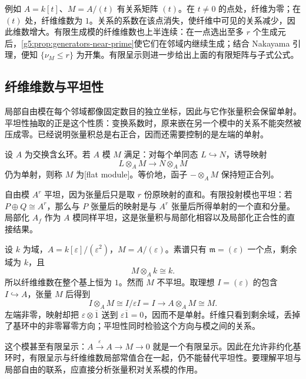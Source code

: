 例如 \(A=k[t]\)、\(M=A/(t)\) 有关系矩阵 \((t)\)。在 \(t\ne0\) 的点处，纤维为零；在 \((t)\) 处，纤维维数为 \(1\)。关系的系数在该点消失，使纤维中可见的关系减少，因此维数增大。有限生成模的纤维维数也上半连续：在一点选出至多 \(r\) 个生成元后，\cref{g5:prop:generators-near-prime}使它们在邻域内继续生成；结合 Nakayama 引理，便知 \(\{\nu_M\leq r\}\) 为开集。有限呈示则进一步给出上面的有限矩阵与子式公式。

\subsection{纤维维数与平坦性}
\label{g5:subsec:0205:04}

局部自由模在每个邻域都像固定数目的独立坐标，因此与它作张量积会保留单射。平坦性抽取的正是这个性质：变换系数时，原来嵌在另一个模中的关系不能突然被压成零。已经说明张量积总是右正合，因而还需要控制的是左端的单射。

\begin{definition}
\label{g5:def:flat-module}
	设 \(A\) 为交换含幺环。若 \(A\) 模 \(M\) 满足：对每个单同态 \(L\hookrightarrow N\)，诱导映射
	\[
		L\otimes_A M\longrightarrow N\otimes_A M
	\]
	仍为单射，则称 \(M\) 为[flat module]。等价地，函子 \(-\otimes_A M\) 保持短正合列。
\end{definition}

自由模 \(A^r\) 平坦，因为张量后只是取 \(r\) 份原映射的直和。有限投射模也平坦：若 \(P\oplus Q\cong A^r\)，那么与 \(P\) 张量后的映射是与 \(A^r\) 张量后所得单射的一个直和分量。局部化 \(A_f\) 作为 \(A\) 模同样平坦，这是张量积与局部化相容以及局部化正合性的直接结果。

\begin{example}
\label{g5:exm:constant-fiber-not-flat}
	设 \(k\) 为域，\(A=k[\varepsilon]/(\varepsilon^2)\)，\(M=A/(\varepsilon)\)。素谱只有 \(\mathfrak m=(\varepsilon)\) 一个点，剩余域为 \(k\)，且
	\[
		M\otimes_A k\cong k.
	\]
	所以纤维维数在整个基上恒为 \(1\)。然而 \(M\) 不平坦。取理想 \(I=(\varepsilon)\) 的包含 \(I\hookrightarrow A\)，张量 \(M\) 后得到
	\[
		I\otimes_A M\cong I/\varepsilon I=I
		\longrightarrow A\otimes_A M\cong M.
	\]
	左端非零，映射却把 \(\varepsilon\otimes\overline1\) 送到 \(\varepsilon\overline1=0\)，因而不是单射。纤维只看到剩余域，丢掉了基环中的非零幂零方向；平坦性同时检验这个方向与模之间的关系。
\end{example}

这个模甚至有限呈示：\(A\xrightarrow{\varepsilon}A\rightarrow M\rightarrow0\) 就是一个有限呈示。因此在允许非约化基环时，有限呈示与纤维维数局部常值合在一起，仍不能替代平坦性。要理解平坦与局部自由的联系，应直接分析张量积对关系模的作用。

